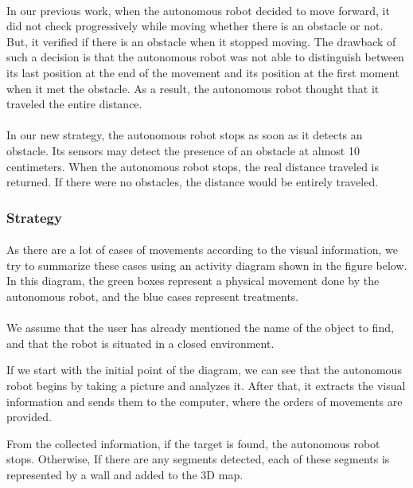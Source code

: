 \documentclass[12pt]{report}
\begin{document}
\paragraph{}
In our previous work, when the autonomous robot decided to move forward, it did not check progressively while moving whether there is an obstacle or not. But, it verified if there is an obstacle when it stopped moving. The drawback of such a decision is that the autonomous robot was not able to distinguish between its last position at the end of the movement and its position at the first moment when it met the obstacle. As a result, the autonomous robot thought that it traveled the entire distance.

\paragraph{}
In our new strategy, the autonomous robot stops as soon as it detects an obstacle. Its sensors may detect the presence of an obstacle at almost 10 centimeters. When the autonomous robot stops, the real distance traveled is returned. If there were no obstacles, the distance would be entirely traveled.
\subsubsection{Strategy}
\paragraph{}
As there are a lot of cases of movements according to the visual information, we try to summarize these cases using an activity diagram shown in the figure below. In this diagram, the green boxes represent a physical movement done by the autonomous robot, and the blue cases represent treatments. 

\paragraph{}
We assume that the user has already mentioned the name of the object to find, and that the robot is situated in a closed environment.

If we start with the initial point of the diagram, we can see that the autonomous robot begins by taking a picture and analyzes it. After that, it extracts the visual information and sends them to the computer, where the orders of movements are provided. 

From the collected information, if the target is found, the autonomous robot stops. Otherwise, If there are any segments detected, each of these segments is represented by a wall and added to the 3D map.
\end{document}
